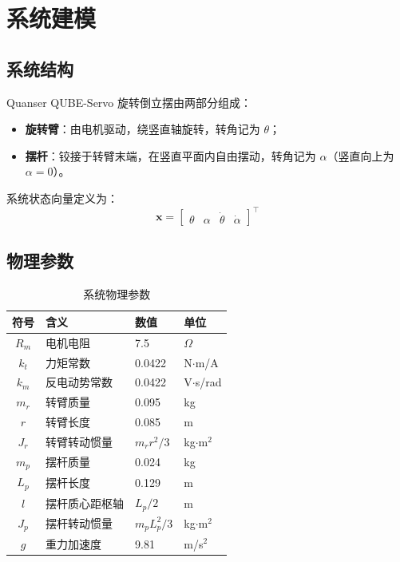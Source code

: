 \documentclass[12pt, a4paper]{article}
\begin{document}
\section{系统建模}

\subsection{系统结构}

Quanser QUBE-Servo 旋转倒立摆由两部分组成：
\begin{itemize}
    \item \textbf{旋转臂}：由电机驱动，绕竖直轴旋转，转角记为 $\theta$；
    \item \textbf{摆杆}：铰接于转臂末端，在竖直平面内自由摆动，转角记为 $\alpha$（竖直向上为 $\alpha = 0$）。
\end{itemize}

系统状态向量定义为：
\begin{equation}
    \bm{x} = \begin{bmatrix} \theta & \alpha & \dot{\theta} & \dot{\alpha} \end{bmatrix}^\top
\end{equation}

\subsection{物理参数}

\begin{table}[H]
\centering
\caption{系统物理参数}
\begin{tabular}{clll}
\toprule
符号 & 含义 & 数值 & 单位 \\
\midrule
$R_m$  & 电机电阻        & 7.5    & $\Omega$ \\
$k_t$  & 力矩常数        & 0.0422 & N$\cdot$m/A \\
$k_m$  & 反电动势常数    & 0.0422 & V$\cdot$s/rad \\
$m_r$  & 转臂质量        & 0.095  & kg \\
$r$    & 转臂长度        & 0.085  & m \\
$J_r$  & 转臂转动惯量    & $m_r r^2/3$ & kg$\cdot$m$^2$ \\
$m_p$  & 摆杆质量        & 0.024  & kg \\
$L_p$  & 摆杆长度        & 0.129  & m \\
$l$    & 摆杆质心距枢轴  & $L_p/2$     & m \\
$J_p$  & 摆杆转动惯量    & $m_p L_p^2/3$ & kg$\cdot$m$^2$ \\
$g$    & 重力加速度      & 9.81   & m/s$^2$ \\
\bottomrule
\end{tabular}
\end{table}
\end{document}
